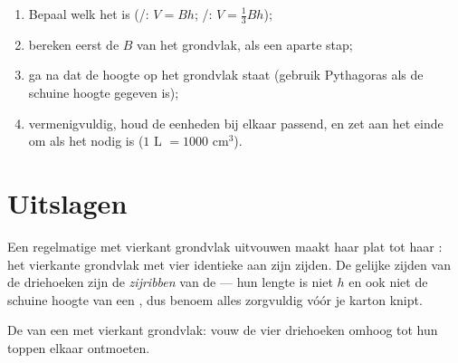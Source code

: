 \begin{method}\label{met:g8:solids:method}
\begin{enumerate}
  \item Bepaal welk  het is (/: $V = Bh$; /:
        $V = \frac13 Bh$);
  \item bereken eerst de  $B$ van het grondvlak, als een aparte stap;
  \item ga na dat de hoogte  op het grondvlak staat (gebruik Pythagoras
        als de schuine hoogte gegeven is);
  \item vermenigvuldig, houd de eenheden bij elkaar passend, en zet aan het einde
        om als het nodig is ($1$ L $= 1000$ cm$^3$).
\end{enumerate}
\end{method}

\section{Uitslagen}

\begin{example}\label{ex:g8:solids:net}
Een regelmatige  met vierkant grondvlak uitvouwen maakt haar plat tot haar
\emph{}: het vierkante grondvlak met vier identieke  aan zijn zijden. De gelijke zijden van de driehoeken zijn de
\emph{zijribben} van de  --- hun lengte is niet $h$ en ook niet de
schuine hoogte van een , dus benoem alles zorgvuldig vóór je karton
knipt.
\end{example}

\begin{omfigure}

{\small De  van een  met vierkant grondvlak: vouw de vier
driehoeken omhoog tot hun toppen elkaar ontmoeten.}
\end{omfigure}

